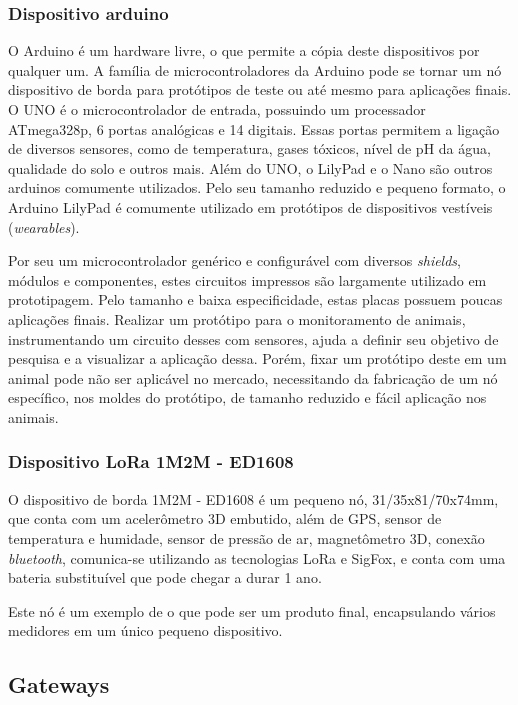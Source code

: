 \documentclass[
    hidelinks,
	12pt,				%
	openany,
	oneside, 
	a4paper,			%
	english,			%
	french,				%
	spanish,			%
	brazil				%
	]{abntex2}
\begin{document}
\subsubsection{Dispositivo arduino}
O Arduino é um hardware livre, o que permite a cópia deste dispositivos por qualquer um. 
A família de microcontroladores da Arduino pode se tornar um nó dispositivo de borda para protótipos de teste ou até mesmo para aplicações finais. O UNO é o microcontrolador de entrada, possuindo um processador ATmega328p, 6 portas analógicas e 14 digitais. Essas portas permitem a ligação de diversos sensores, como de temperatura, gases tóxicos, nível de pH da água, qualidade do solo e outros mais. Além do UNO, o LilyPad e o Nano são outros arduinos comumente utilizados. Pelo seu tamanho reduzido e pequeno formato, o Arduino LilyPad é comumente utilizado em protótipos de dispositivos vestíveis (\textit{wearables}).

Por seu um microcontrolador genérico e configurável com diversos \textit{shields}, módulos e componentes, estes circuitos impressos são largamente utilizado em prototipagem. Pelo tamanho e baixa especificidade, estas placas possuem poucas aplicações finais. Realizar um protótipo para o monitoramento de animais, instrumentando um circuito desses com sensores, ajuda a definir seu objetivo de pesquisa e a visualizar a aplicação dessa. Porém, fixar um protótipo deste em um animal pode não ser aplicável no mercado, necessitando da fabricação de um nó específico, nos moldes do protótipo, de tamanho reduzido e fácil aplicação nos animais.

\subsubsection{Dispositivo LoRa 1M2M - ED1608}

O dispositivo de borda 1M2M - ED1608 é um pequeno nó, 31/35x81/70x74mm, que conta com um acelerômetro 3D embutido, além de GPS, sensor de temperatura e humidade, sensor de pressão de ar, magnetômetro 3D, conexão \textit{bluetooth}, comunica-se utilizando as tecnologias LoRa e SigFox, e conta com uma bateria substituível que pode chegar a durar 1 ano.

Este nó é um exemplo de o que pode ser um produto final, encapsulando vários medidores em um único pequeno dispositivo.

\subsection{Gateways}\label{gateways}
\end{document}
